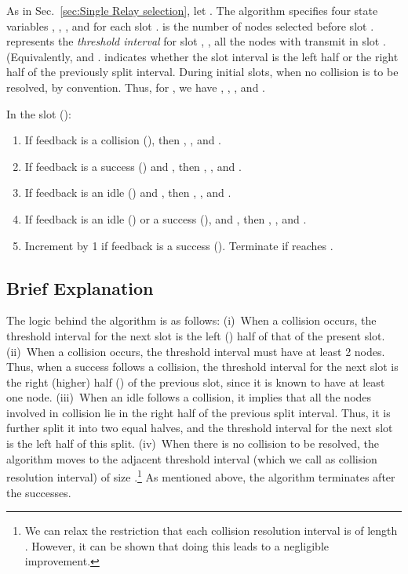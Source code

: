 \documentclass[12pt,draftcls,peerreview, onecolumn]{IEEEtran}
\begin{document}
As in Sec.~\ref{sec:Single Relay selection}, let .
The algorithm specifies four state variables , ,
, and  for each slot .  is the number
of nodes selected before slot .  
represents the {\em threshold interval} for slot , , all the
nodes with  transmit in slot .
(Equivalently,  and \mbox{.}
 indicates whether the  slot interval is
the left half or the right half of the previously split interval.
During initial slots, when no collision is to be resolved,
 by convention. Thus, for , we have
, , , and .


In the  slot ():
\begin{enumerate}
\item If feedback is a collision (), then , \mbox{,} and .

\item If feedback is a success () and , then \mbox{}, ,
and \mbox{. }

\item If feedback is an idle () and , then \mbox{,} , and .

\item If feedback is an idle () or a success (), and , then , , and .

\item Increment  by 1 if feedback is a success (). Terminate if  reaches .
\end{enumerate}

\subsection{Brief Explanation}

The logic behind the algorithm is as follows: (i)~When a collision
occurs, the threshold interval for the next slot is the left ()
half of that of the present slot. (ii)~When a collision occurs, the
threshold interval must have at least 2 nodes. Thus, when a success
follows a collision, the threshold interval for the next slot is the
right (higher) half () of the previous slot, since it is known to
have at least one node.  (iii)~When an idle follows a collision, it
implies that all the nodes involved in collision lie in the right half
of the previous split interval. Thus, it is further split it into two
equal halves, and the threshold interval for the next slot is the left
half of this split.  (iv)~When there is no collision to be resolved,
the algorithm moves to the adjacent threshold interval (which we call
as collision resolution interval) of size .\footnote{We can relax
  the restriction that each collision resolution interval is of length
  . However, it can be shown that doing this leads to a
  negligible improvement.} As mentioned above, the algorithm
terminates after the  successes.
\end{document}
